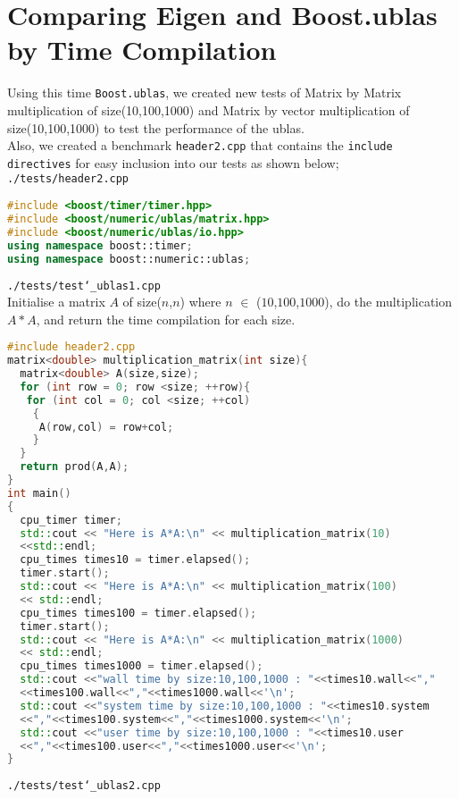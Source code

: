 \documentclass[11pt]{article}
\begin{document}
\section{Comparing Eigen and Boost.ublas by Time Compilation}
Using this time \texttt{Boost.ublas}, we created new tests of Matrix by Matrix multiplication of size(10,100,1000) and Matrix by vector multiplication of size(10,100,1000) to test the performance of the ublas.\\
Also, we created a benchmark \texttt{header2.cpp} that contains the \texttt{include directives} for easy inclusion into our tests as shown below;\\
\texttt{./tests/header2.cpp}
\begin{lstlisting}[language=c++]
#include <boost/timer/timer.hpp>
#include <boost/numeric/ublas/matrix.hpp>
#include <boost/numeric/ublas/io.hpp>
using namespace boost::timer;
using namespace boost::numeric::ublas;
\end{lstlisting}
\vspace{5mm}
\texttt{./tests/test\char`_ublas1.cpp}\\
Initialise a matrix $A$ of size($n$,$n$) where $n$ $\in$ ($10$,$100$,$1000$), do the multiplication $A*A$, and return the time compilation for each\vspace{5mm} size.\\
\begin{lstlisting}[language=c++]
#include header2.cpp
matrix<double> multiplication_matrix(int size){
  matrix<double> A(size,size);
  for (int row = 0; row <size; ++row){
   for (int col = 0; col <size; ++col)
    {
     A(row,col) = row+col;
    }
  }
  return prod(A,A);
}
int main()
{
  cpu_timer timer;
  std::cout << "Here is A*A:\n" << multiplication_matrix(10)
  <<std::endl;
  cpu_times times10 = timer.elapsed();
  timer.start();
  std::cout << "Here is A*A:\n" << multiplication_matrix(100)
  << std::endl;
  cpu_times times100 = timer.elapsed();
  timer.start();  
  std::cout << "Here is A*A:\n" << multiplication_matrix(1000) 
  << std::endl;
  cpu_times times1000 = timer.elapsed();
  std::cout <<"wall time by size:10,100,1000 : "<<times10.wall<<","
  <<times100.wall<<","<<times1000.wall<<'\n';
  std::cout <<"system time by size:10,100,1000 : "<<times10.system
  <<","<<times100.system<<","<<times1000.system<<'\n';
  std::cout <<"user time by size:10,100,1000 : "<<times10.user
  <<","<<times100.user<<","<<times1000.user<<'\n'; 
}
\end{lstlisting}
\vspace{5mm}
\texttt{./tests/test\char`_ublas2.cpp} \\
\end{document}
